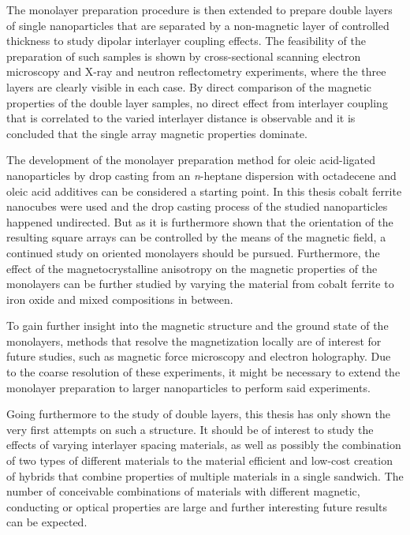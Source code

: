 \documentclass[\main/dresen_thesis.tex]{subfiles}
\begin{document}
  The monolayer preparation procedure is then extended to prepare double layers of single nanoparticles that are separated by a non-magnetic layer of controlled thickness to study dipolar interlayer coupling effects.
  The feasibility of the preparation of such samples is shown by cross-sectional scanning electron microscopy and X-ray and neutron reflectometry experiments, where the three layers are clearly visible in each case.
  By direct comparison of the magnetic properties of the double layer samples, no direct effect from interlayer coupling that is correlated to the varied interlayer distance is observable and it is concluded that the single array magnetic properties dominate.

    The development of the monolayer preparation method for oleic acid-ligated nanoparticles by drop casting from an \textit{n}-heptane dispersion with octadecene and oleic acid additives can be considered a starting point.
    In this thesis cobalt ferrite nanocubes were used and the drop casting process of the studied nanoparticles happened undirected.
    But as it is furthermore shown that the orientation of the resulting square arrays can be controlled by the means of the magnetic field, a continued study on oriented monolayers should be pursued.
    Furthermore, the effect of the magnetocrystalline anisotropy on the magnetic properties of the monolayers can be further studied by varying the material from cobalt ferrite to iron oxide and mixed compositions in between.

    To gain further insight into the magnetic structure and the ground state of the monolayers, methods that resolve the magnetization locally are of interest for future studies, such as magnetic force microscopy and electron holography.
    Due to the coarse resolution of these experiments, it might be necessary to extend the monolayer preparation to larger nanoparticles to perform said experiments.

    Going furthermore to the study of double layers, this thesis has only shown the very first attempts on such a structure.
    It should be of interest to study the effects of varying interlayer spacing materials, as well as possibly the combination of two types of different materials to the material efficient and low-cost creation of hybrids that combine properties of multiple materials in a single sandwich.
    The number of conceivable combinations of materials with different magnetic, conducting or optical properties are large and further interesting future results can be expected.
\end{document}
